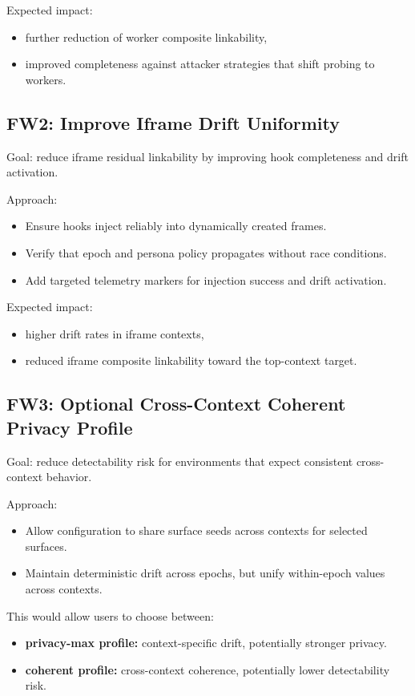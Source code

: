 \documentclass[11pt]{report}
\begin{document}
Expected impact:
\begin{itemize}
    \item further reduction of worker composite linkability,
    \item improved completeness against attacker strategies that shift probing to workers.
\end{itemize}

\subsection{FW2: Improve Iframe Drift Uniformity}

Goal: reduce iframe residual linkability by improving hook completeness and drift activation.

Approach:
\begin{itemize}
    \item Ensure hooks inject reliably into dynamically created frames.
    \item Verify that epoch and persona policy propagates without race conditions.
    \item Add targeted telemetry markers for injection success and drift activation.
\end{itemize}

Expected impact:
\begin{itemize}
    \item higher drift rates in iframe contexts,
    \item reduced iframe composite linkability toward the top-context target.
\end{itemize}

\subsection{FW3: Optional Cross-Context Coherent Privacy Profile}

Goal: reduce detectability risk for environments that expect consistent cross-context behavior.

Approach:
\begin{itemize}
    \item Allow configuration to share surface seeds across contexts for selected surfaces.
    \item Maintain deterministic drift across epochs, but unify within-epoch values across contexts.
\end{itemize}

This would allow users to choose between:
\begin{itemize}
    \item \textbf{privacy-max profile:} context-specific drift, potentially stronger privacy.
    \item \textbf{coherent profile:} cross-context coherence, potentially lower detectability risk.
\end{itemize}
\end{document}
